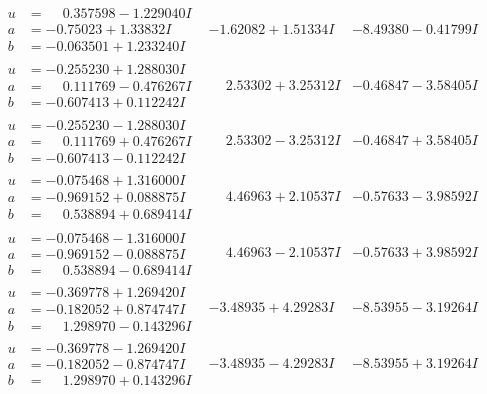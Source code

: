 \documentclass[1p]{elsarticle_modified}
\theoremstyle{definition}
\begin{document}
$$\begin{array}{c|c|c}
\begin{aligned}
u &= \phantom{-}0.357598 - 1.229040 I \\
a &= -0.75023 + 1.33832 I \\
b &= -0.063501 + 1.233240 I\end{aligned}
 & -1.62082 + 1.51334 I & -8.49380 - 0.41799 I \\ \hline\begin{aligned}
u &= -0.255230 + 1.288030 I \\
a &= \phantom{-}0.111769 - 0.476267 I \\
b &= -0.607413 + 0.112242 I\end{aligned}
 & \phantom{-}2.53302 + 3.25312 I & -0.46847 - 3.58405 I \\ \hline\begin{aligned}
u &= -0.255230 - 1.288030 I \\
a &= \phantom{-}0.111769 + 0.476267 I \\
b &= -0.607413 - 0.112242 I\end{aligned}
 & \phantom{-}2.53302 - 3.25312 I & -0.46847 + 3.58405 I \\ \hline\begin{aligned}
u &= -0.075468 + 1.316000 I \\
a &= -0.969152 + 0.088875 I \\
b &= \phantom{-}0.538894 + 0.689414 I\end{aligned}
 & \phantom{-}4.46963 + 2.10537 I & -0.57633 - 3.98592 I \\ \hline\begin{aligned}
u &= -0.075468 - 1.316000 I \\
a &= -0.969152 - 0.088875 I \\
b &= \phantom{-}0.538894 - 0.689414 I\end{aligned}
 & \phantom{-}4.46963 - 2.10537 I & -0.57633 + 3.98592 I \\ \hline\begin{aligned}
u &= -0.369778 + 1.269420 I \\
a &= -0.182052 + 0.874747 I \\
b &= \phantom{-}1.298970 - 0.143296 I\end{aligned}
 & -3.48935 + 4.29283 I & -8.53955 - 3.19264 I \\ \hline\begin{aligned}
u &= -0.369778 - 1.269420 I \\
a &= -0.182052 - 0.874747 I \\
b &= \phantom{-}1.298970 + 0.143296 I\end{aligned}
 & -3.48935 - 4.29283 I & -8.53955 + 3.19264 I \\ \hline\begin{aligned}

\end{aligned}
\end{array}$$
\end{document}
